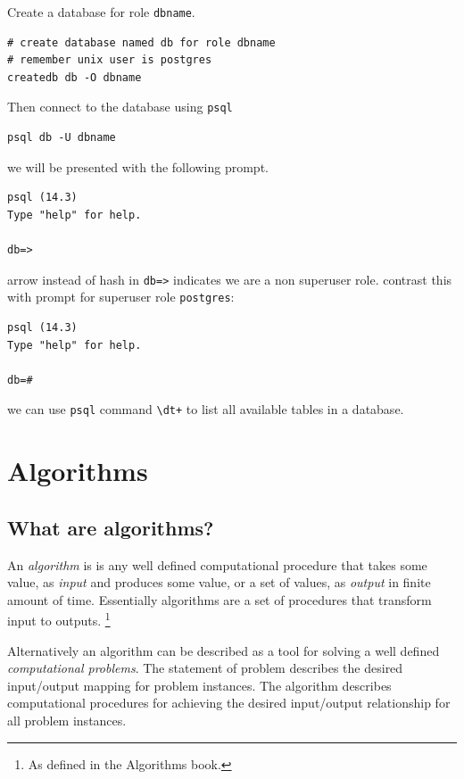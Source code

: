 \documentclass[a4paper]{article}
\begin{document}
Create a database for role \lstinline{dbname}.

\begin{lstlisting}
# create database named db for role dbname
# remember unix user is postgres
createdb db -O dbname
\end{lstlisting}

Then connect to the database using \lstinline{psql}

\begin{lstlisting}
psql db -U dbname
\end{lstlisting}

we will be presented with the following prompt.

\begin{lstlisting}
psql (14.3)
Type "help" for help.

db=> 
\end{lstlisting}

arrow instead of hash in \lstinline{db=>} indicates we are a non superuser role. contrast this with prompt for superuser role
\lstinline{postgres}:

\begin{lstlisting}
psql (14.3)
Type "help" for help.

db=#
\end{lstlisting}

we can use \lstinline{psql} command \lstinline{\dt+} to list all available tables in a database.

\section*{Algorithms}

\subsection*{What are algorithms?}

An \emph{algorithm} is is any well defined computational procedure that takes some value, as \emph{input} and produces some value, 
or a set of values, as \emph{output} in finite amount of time. Essentially algorithms are a set of procedures that transform input to outputs.
\footnote{As defined in the Algorithms book.}

Alternatively an algorithm can be described as a tool for solving a well defined \emph{computational problems}. The statement of problem describes
the desired input/output mapping for problem instances. The algorithm describes computational procedures for achieving the desired input/output relationship
for all problem instances.
\end{document}
